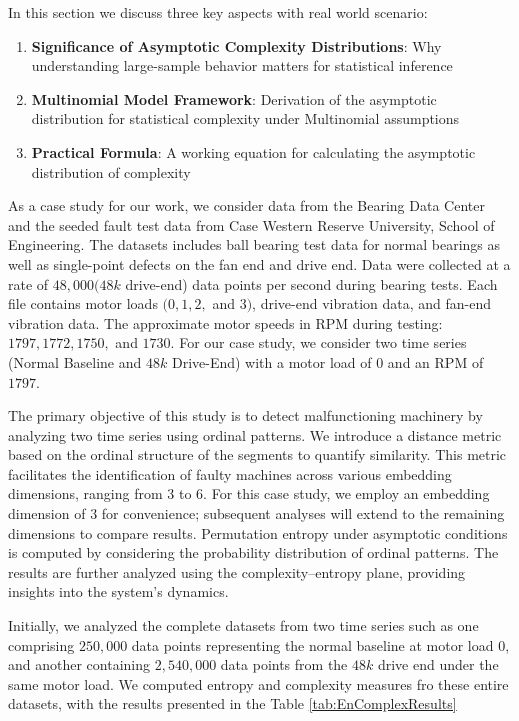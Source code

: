In this section we discuss three key aspects with real world scenario:
\begin{enumerate}
	\item \textbf{Significance of Asymptotic Complexity Distributions}: Why understanding large-sample behavior matters for statistical inference
	\item \textbf{Multinomial Model Framework}: Derivation of the asymptotic distribution for statistical complexity under Multinomial assumptions
	\item \textbf{Practical Formula}: A working equation for calculating the asymptotic distribution of complexity
\end{enumerate}

As a case study for our work, we consider data from the Bearing Data Center and the seeded fault test data from Case Western Reserve University, School of Engineering. The datasets includes ball bearing test data for normal bearings as well as single-point defects on the fan end and drive end. Data were collected at a rate of $48,000 (48k$ drive-end) data points per second during bearing tests. Each file contains motor loads $(0, 1, 2,$ and $3)$, drive-end vibration data, and fan-end vibration data. The approximate motor speeds in RPM during testing: $1797, 1772, 1750,$ and $1730$. For our case study, we consider two time series (Normal Baseline and $48k$ Drive-End) with a motor load of $0$ and an RPM of $1797$. 

The primary objective of this study is to detect malfunctioning machinery by analyzing two time series using ordinal patterns. We introduce a distance metric based on the ordinal structure of the segments to quantify similarity. This metric facilitates the identification of faulty machines across various embedding dimensions, ranging from $3$ to $6$. For this case study, we employ an embedding dimension of $3$ for convenience; subsequent analyses will extend to the remaining dimensions to compare results. Permutation entropy under asymptotic conditions is computed by considering the probability distribution of ordinal patterns. The results are further analyzed using the complexity–entropy plane, providing insights into the system's dynamics.

Initially, we analyzed the complete datasets from two time series such as one comprising $250,000$ data points representing the normal baseline at motor load $0$, and another containing $2,540,000$ data points from the $48k$ drive end under the same motor load. We computed entropy and complexity measures fro these entire datasets, with the results presented in the Table \ref{tab:EnComplexResults}


